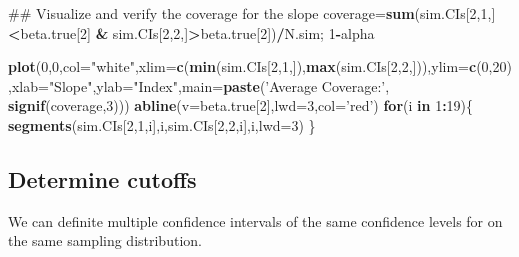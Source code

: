 \documentclass[12pt,]{book}
\newenvironment{Shaded}{\begin{snugshade}}{\end{snugshade}}
\newcommand{\KeywordTok}[1]{\textcolor[rgb]{0.13,0.29,0.53}{\textbf{#1}}}
\newcommand{\DataTypeTok}[1]{\textcolor[rgb]{0.13,0.29,0.53}{#1}}
\newcommand{\DecValTok}[1]{\textcolor[rgb]{0.00,0.00,0.81}{#1}}
\newcommand{\StringTok}[1]{\textcolor[rgb]{0.31,0.60,0.02}{#1}}
\newcommand{\ControlFlowTok}[1]{\textcolor[rgb]{0.13,0.29,0.53}{\textbf{#1}}}
\newcommand{\OperatorTok}[1]{\textcolor[rgb]{0.81,0.36,0.00}{\textbf{#1}}}
\newcommand{\NormalTok}[1]{#1}
\begin{document}
\begin{Shaded}
\begin{Highlighting}[]
\NormalTok{## Visualize and verify the coverage for the slope }
\NormalTok{coverage=}\KeywordTok{sum}\NormalTok{(sim.CIs[}\DecValTok{2}\NormalTok{,}\DecValTok{1}\NormalTok{,]}\OperatorTok{<}\NormalTok{beta.true[}\DecValTok{2}\NormalTok{] }\OperatorTok{&}\StringTok{ }\NormalTok{sim.CIs[}\DecValTok{2}\NormalTok{,}\DecValTok{2}\NormalTok{,]}\OperatorTok{>}\NormalTok{beta.true[}\DecValTok{2}\NormalTok{])}\OperatorTok{/}\NormalTok{N.sim;}
\DecValTok{1}\OperatorTok{-}\NormalTok{alpha}

\KeywordTok{plot}\NormalTok{(}\DecValTok{0}\NormalTok{,}\DecValTok{0}\NormalTok{,}\DataTypeTok{col=}\StringTok{"white"}\NormalTok{,}\DataTypeTok{xlim=}\KeywordTok{c}\NormalTok{(}\KeywordTok{min}\NormalTok{(sim.CIs[}\DecValTok{2}\NormalTok{,}\DecValTok{1}\NormalTok{,]),}\KeywordTok{max}\NormalTok{(sim.CIs[}\DecValTok{2}\NormalTok{,}\DecValTok{2}\NormalTok{,])),}\DataTypeTok{ylim=}\KeywordTok{c}\NormalTok{(}\DecValTok{0}\NormalTok{,}\DecValTok{20}\NormalTok{),}\DataTypeTok{xlab=}\StringTok{"Slope"}\NormalTok{,}\DataTypeTok{ylab=}\StringTok{"Index"}\NormalTok{,}\DataTypeTok{main=}\KeywordTok{paste}\NormalTok{(}\StringTok{'Average Coverage:'}\NormalTok{, }\KeywordTok{signif}\NormalTok{(coverage,}\DecValTok{3}\NormalTok{)))}
\KeywordTok{abline}\NormalTok{(}\DataTypeTok{v=}\NormalTok{beta.true[}\DecValTok{2}\NormalTok{],}\DataTypeTok{lwd=}\DecValTok{3}\NormalTok{,}\DataTypeTok{col=}\StringTok{'red'}\NormalTok{)}
\ControlFlowTok{for}\NormalTok{(i }\ControlFlowTok{in} \DecValTok{1}\OperatorTok{:}\DecValTok{19}\NormalTok{)\{}
  \KeywordTok{segments}\NormalTok{(sim.CIs[}\DecValTok{2}\NormalTok{,}\DecValTok{1}\NormalTok{,i],i,sim.CIs[}\DecValTok{2}\NormalTok{,}\DecValTok{2}\NormalTok{,i],i,}\DataTypeTok{lwd=}\DecValTok{3}\NormalTok{)}
\NormalTok{\}}
\end{Highlighting}
\end{Shaded}

\subsection{Determine cutoffs}\label{determine-cutoffs}

We can definite multiple confidence intervals of the same confidence
levels for on the same sampling distribution.
\end{document}
